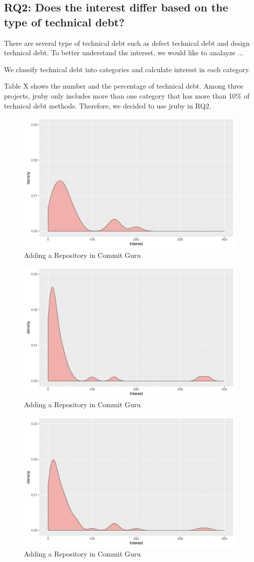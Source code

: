 \documentclass[conference]{IEEEtran}
\begin{document}

\subsection{RQ2: Does the interest differ based on the type of technical debt?}
There are several type of technical debt such as defect technical debt and design technical debt. 
To better understand the interest, we would like to analayze ...

We classify technical debt into categories and calculate interest in each category.

Table X shows the number and the percentage of technical debt. Among three projects, jruby only includes more than one category that has more than 10\% of technical debt methods. Therefore, we decided to use jruby in RQ2.


\begin{figure}
  \centering
  \includegraphics[width=.45\textwidth]{figures/rq2-defect}
  \caption{Adding a Repository in Commit Guru \label{fig:guru1}}
\end{figure}
\begin{figure}
  \centering
  \includegraphics[width=.45\textwidth]{figures/rq2-design}
  \caption{Adding a Repository in Commit Guru \label{fig:guru1}}
\end{figure}
\begin{figure}
  \centering
  \includegraphics[width=.45\textwidth]{figures/rq2-requirement}
  \caption{Adding a Repository in Commit Guru \label{fig:guru1}}
\end{figure}
\end{document}
